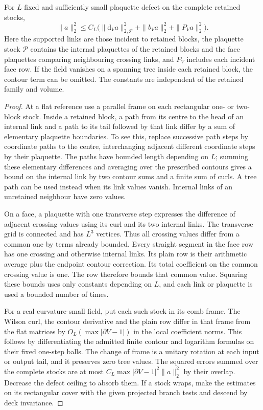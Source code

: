 \documentclass[11pt,letterpaper,reqno]{amsart}
\makeatletter
\numberwithin{equation}{section}
\theoremstyle{definition}
\newcommand{\ms@minorstart}{%
  \pushQED{\qed}\renewcommand{\qedsymbol}{$\blacksquare$}}
\newenvironment{lemma}[1][]{\ms@minorstart\ms@lemma[#1]}
  {\popQED\endms@lemma}
\theoremstyle{remark}
\makeatother
\begin{document}
\begin{lemma}[The outer curl and contour inequality]\label{mb:lem-outer-geometry}
For \(L\) fixed and sufficiently small plaquette defect on the
complete retained stocks,
\begin{equation}\label{mb:eq-outer-geometry}
 \|a\|_2^2\le C_L\bigl(\|\mathrm d_Va\|_{2,\mathcal P}^2
                           +\|b_Va\|_2^2+\|P_Va\|_2^2\bigr).
\end{equation}
Here the supported links are those incident to retained blocks,
the plaquette stock \(\mathcal P\) contains the internal plaquettes
of the retained blocks and the face plaquettes comparing
neighbouring crossing links, and \(P_V\) includes each incident
face row. If the field vanishes on a spanning tree inside each
retained block, the contour term can be omitted.
The constants are independent of the retained family and volume.
\end{lemma}

\begin{proof}
At a flat reference use a parallel frame on each rectangular
one- or two-block stock. Inside a retained block, a path from
its centre to the head of an internal link and a path to its
tail followed by that link differ by a sum of elementary
plaquette boundaries. To see this, replace successive path
steps by coordinate paths to the centre, interchanging adjacent
different coordinate steps by their plaquette. The paths have
bounded length depending on \(L\); summing these elementary
differences and averaging over the prescribed contours gives a
bound on the internal link by two contour sums and a finite sum
of curls. A tree path can be used instead when its link values
vanish. Internal links of an unretained neighbour have zero
values.

On a face, a plaquette with one transverse step expresses the
difference of adjacent crossing values using its curl and its
two internal links. The transverse grid is connected and has
\(L^3\) vertices. Thus all crossing values differ from a common
one by terms already bounded. Every straight segment in the
face row has one crossing and otherwise internal links.
Its plain row is their arithmetic average plus the endpoint
contour correction. Its total coefficient on the common
crossing value is one. The row therefore bounds that common
value. Squaring these bounds uses only constants depending
on \(L\), and each link or plaquette is used a bounded number
of times.

For a real curvature-small field, put each such stock in its
comb frame. The Wilson curl, the contour derivative and the
plain row differ in that frame from the flat matrices by
\(O_L(\max|\partial V-1|)\) in the local coefficient norms.
This follows by differentiating the admitted finite contour
and logarithm formulas on their fixed one-step balls.
The change of frame is a unitary rotation at each input or
output tail, and it preserves zero tree values. The squared
errors summed over the complete stocks are at most
\(C_L\max|\partial V-1|^2\|a\|_2^2\) by their overlap.
Decrease the defect ceiling to absorb them. If a stock wraps,
make the estimates on its rectangular cover with the
given projected branch tests and descend by deck invariance.
\end{proof}
\end{document}
